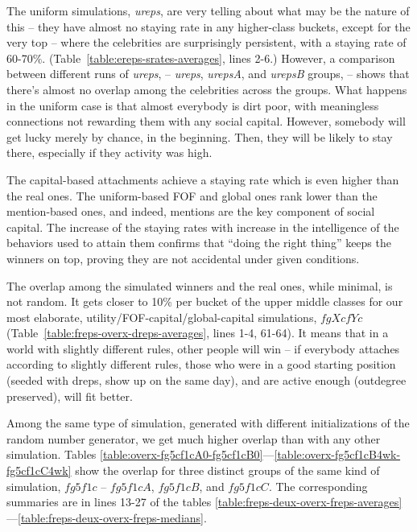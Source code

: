 \documentclass[10pt,oneside]{memoir}
\begin{document}
The uniform simulations, {\itshape ureps}, are very telling about what may be the nature of this -- they have almost no staying rate in any higher-class buckets, except for the very top -- where the celebrities are surprisingly persistent, with a staying rate of 60-70\%.  (Table~\ref{table:ereps-srates-averages}, lines 2-6.)  However, a comparison between different runs of {\itshape ureps}, -- {\itshape ureps}, {\itshape urepsA}, and {\itshape urepsB} groups, -- shows that there's almost no overlap among the celebrities across the groups.  What happens in the uniform case is that almost everybody is dirt poor, with meaningless connections not rewarding them with any social capital.  However, somebody will get lucky merely by chance, in the beginning.  Then, they will be likely to stay there, especially if they activity was high.


The capital-based attachments achieve a staying rate which is even higher than the real ones.  The uniform-based FOF and global ones rank lower than the mention-based ones, and indeed, mentions are the key component of social capital.  The increase of the staying rates with increase in the intelligence of the behaviors used to attain them confirms that ``doing the right thing'' keeps the winners on top, proving they are not accidental under given conditions.


The overlap among the simulated winners and the real ones, while minimal, is not random.  It gets closer to 10\% per bucket of the upper middle classes for our most elaborate, utility/FOF-capital/global-capital simulations, $fgXcfYc$ (Table~\ref{table:freps-overx-dreps-averages}, lines 1-4, 61-64).  It means that in a world with slightly different rules, other people will win -- if everybody attaches according to slightly different rules, those who were in a good starting position (seeded with dreps, show up on the same day), and are active enough (outdegree preserved), will fit better.


Among the same type of simulation, generated with different initializations of the random number generator, we get much higher overlap than with any other simulation.  Tables \ref{table:overx-fg5cf1cA0-fg5cf1cB0}---\ref{table:overx-fg5cf1cB4wk-fg5cf1cC4wk} show the overlap for three distinct groups of the same kind of simulation, $fg5f1c$ -- $fg5f1cA$, $fg5f1cB$, and $fg5f1cC$.  The corresponding summaries are in lines 13-27 of the tables \ref{table:freps-deux-overx-freps-averages}---\ref{table:freps-deux-overx-freps-medians}.
\end{document}

